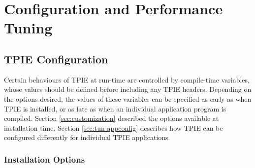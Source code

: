 \chapter{Configuration and Performance Tuning}


\section{TPIE Configuration}
Certain behaviours of TPIE at run-time are controlled by
compile-time variables, whose values should be defined
before including any TPIE headers. Depending on the options
desired, the values of these variables can be specified as
early as when TPIE is installed, or as late as when an
individual application program is compiled. Section
\ref{sec:customization} described the options available at
installation time. Section \ref{sec:tun-appconfig} describes
how TPIE can be configured differently for individual TPIE
applications.

\subsection{Installation Options}
 

